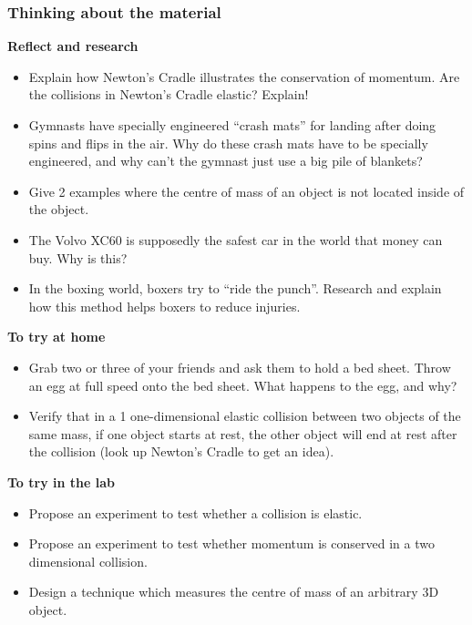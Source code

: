 \subsubsection{Thinking about the material}

\begin{framed}
\textbf{Reflect and research}\\
\begin{itemize}
\item Explain how Newton's Cradle illustrates the conservation of momentum. Are the collisions in Newton's Cradle elastic? Explain!
\item Gymnasts have specially engineered ``crash mats'' for landing after doing spins and flips in the air. Why do these crash mats have to be specially engineered, and why can't the gymnast just use a big pile of blankets?
\item Give 2 examples where the centre of mass of an object is not located inside of the object.
\item The Volvo XC60 is supposedly the safest car in the world that money can buy. Why is this?
\item In the boxing world, boxers try to ``ride the punch''. Research and explain how this method helps boxers to reduce injuries.
\end{itemize}
\end{framed}

\begin{framed}
\textbf{To try at home}\\
\begin{itemize}
\item Grab two or three of your friends and ask them to hold a bed sheet. Throw an egg at full speed onto the bed sheet. What happens to the egg, and why?
\item Verify that in a 1 one-dimensional elastic collision between two objects of the same mass, if one object starts at rest, the other object will end at rest after the collision (look up Newton's Cradle to get an idea).
\end{itemize}
\end{framed}

\begin{framed}
\textbf{To try in the lab}\\
\begin{itemize}
\item Propose an experiment to test whether a collision is elastic.
\item Propose an experiment to test whether momentum is conserved in a two dimensional collision.
\item Design a technique which measures the centre of mass of an arbitrary 3D object.
\end{itemize}
\end{framed}

